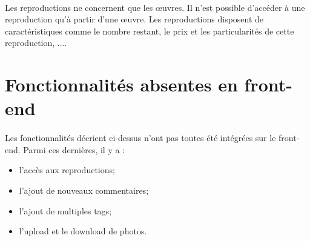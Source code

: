 \paragraph{}
Les reproductions ne concernent que les \oe{}uvres. Il n'est possible d'accéder à une reproduction qu'à partir d'une \oe{}uvre. Les reproductions disposent de caractéristiques comme le nombre restant, le prix et les particularités de cette reproduction, ....

\section{Fonctionnalités absentes en front-end}
\paragraph{}
Les fonctionnalités décrient ci-dessus n'ont pas toutes été intégrées sur le front-end. Parmi ces dernières, il y a :
\begin{itemize}
\item l'accès aux reproductions;
\item l'ajout de nouveaux commentaires;
\item l'ajout de multiples tags;
\item l'upload et le download de photos.
\end{itemize}

